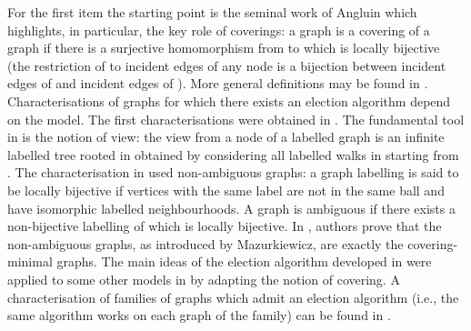 \documentclass[11pt,envcountsame,letterpaper]{llncs}
\begin{document}
For the first item  the starting point is the seminal  work of Angluin
\cite{Angluin} which
 highlights, in particular, the key role of coverings: a graph  is a 
covering of a graph  if there is a surjective homomorphism
 from  to  which is locally bijective (the restriction of
 to incident edges of any node  is a bijection between
incident edges of  and incident edges of ).
 More general definitions may be found in \cite{BVfibrations}.
Characterisations of graphs for which there exists an election algorithm
depend on the model.
The first  characterisations were obtained in
\cite{BVelection,YKsolvable,MazurEnum}.
The fundamental tool in 
\cite{BVelection,YKsolvable} is the notion of view: the view from a node
 of a labelled graph  is an infinite labelled tree rooted in 
obtained by considering all labelled walks in  starting from .
The characterisation in \cite{MazurEnum} used non-ambiguous graphs:
a graph labelling is said to be locally bijective if vertices with the same
label are not in the same ball and 
have isomorphic labelled neighbourhoods. A graph  is   ambiguous 
if there exists a non-bijective
  labelling of  which is locally bijective.
In \cite{GMMrecog}, authors  prove that  the non-ambiguous graphs, as 
introduced by Mazurkiewicz, are exactly
the covering-minimal graphs.
The main ideas of the election algorithm developed in  
\cite{MazurEnum} were applied 
 to some other models in
\cite{CMasynj,CMsynchro,Csofsem} by adapting the notion of covering.
A characterisation of families of graphs which admit an election algorithm
(i.e., the same algorithm works on each graph of the family)
can be found in \cite{CGM12}.
\end{document}
